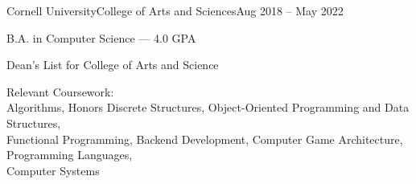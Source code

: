 \documentclass{resume}
\begin{document}
\begin{education}
    \begin{entryleft}{Cornell University}{College of Arts and
        Sciences}{Aug 2018 -- May 2022}

        \begin{description}
            \item B.A. in Computer Science --- 4.0 GPA
            \item Dean's List for College of Arts and Science
            \item Relevant Coursework: \\ \vspace{1pt}
                Algorithms, Honors Discrete Structures, Object-Oriented
                Programming and Data Structures, \\
                Functional Programming, Backend Development,
                Computer Game Architecture, Programming Languages, \\
                Computer Systems
        \end{description}
    \end{entryleft}

\end{education}
\end{document}
